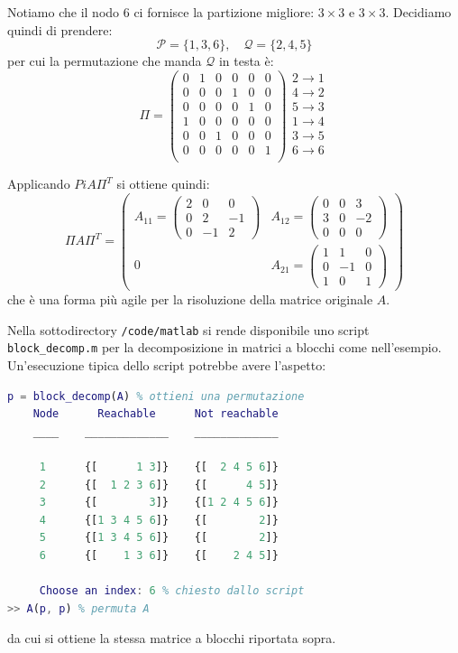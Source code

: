 \documentclass[a4paper,11pt]{article}
\begin{document}
Notiamo che il nodo 6 ci fornisce la partizione migliore: $3 \times 3$ e $3 \times 3$.
Decidiamo quindi di prendere:
$$
\mathcal{P} = \{ 1, 3, 6 \}, \quad \mathcal{Q} = \{ 2, 4, 5 \}
$$
per cui la permutazione che manda $\mathcal{Q}$ in testa è:
$$
\Pi = \begin{pmatrix}
	0 & 1 & 0 & 0 & 0 & 0 \\
	0 & 0 & 0 & 1 & 0 & 0 \\
	0 & 0 & 0 & 0 & 1 & 0 \\
	1 & 0 & 0 & 0 & 0 & 0 \\
	0 & 0 & 1 & 0 & 0 & 0 \\
	0 & 0 & 0 & 0 & 0 & 1 \\
\end{pmatrix}
\begin{array}{c}
	2 \rightarrow 1 \\
	4 \rightarrow 2 \\
	5 \rightarrow 3 \\
	1 \rightarrow 4 \\
	3 \rightarrow 5 \\
	6 \rightarrow 6 \\
\end{array}
$$

Applicando $Pi A \Pi^T$ si ottiene quindi:
$$
\Pi A \Pi^T = \begin{pmatrix}
	A_{11} =
	\begin{pmatrix}
		2 &  0 &  0 \\
		0 &  2 & -1 \\
		0 & -1 &  2
	\end{pmatrix} &
	A_{12} = 
	\begin{pmatrix}
		0 &  0 &  3 \\
		3 &  0 & -2 \\
		0 &  0 &  0
	\end{pmatrix} \\
	0 &
	A_{21} = 
	\begin{pmatrix}
		1 &  1 &  0 \\
		0 & -1 &  0 \\
		1 &  0 &  1
	\end{pmatrix}
\end{pmatrix}
$$
che è una forma più agile per la risoluzione della matrice originale $A$.

Nella sottodirectory \lstinline|/code/matlab| si rende disponibile uno script \lstinline|block_decomp.m| per la decomposizione in matrici a blocchi come nell'esempio.
Un'esecuzione tipica dello script potrebbe avere l'aspetto:
\begin{lstlisting}[language=matlab, style=codestyle]	
p = block_decomp(A) % ottieni una permutazione
    Node      Reachable      Not reachable
    ____    _____________    _____________

     1      {[      1 3]}    {[  2 4 5 6]}
     2      {[  1 2 3 6]}    {[      4 5]}
     3      {[        3]}    {[1 2 4 5 6]}
     4      {[1 3 4 5 6]}    {[        2]}
     5      {[1 3 4 5 6]}    {[        2]}
     6      {[    1 3 6]}    {[    2 4 5]}
   
	 Choose an index: 6 % chiesto dallo script
>> A(p, p) % permuta A
\end{lstlisting}
da cui si ottiene la stessa matrice a blocchi riportata sopra.
\end{document}
